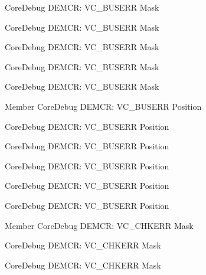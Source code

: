 \begin{DoxyRefList}
\label{deprecated__deprecated000060}%
%
Core\+Debug DEMCR\+: VC\+\_\+\+BUSERR Mask 

\label{deprecated__deprecated000613}%
%
Core\+Debug DEMCR\+: VC\+\_\+\+BUSERR Mask 

\label{deprecated__deprecated000346}%
%
Core\+Debug DEMCR\+: VC\+\_\+\+BUSERR Mask 

\label{deprecated__deprecated000422}%
%
Core\+Debug DEMCR\+: VC\+\_\+\+BUSERR Mask 

\label{deprecated__deprecated000204}%
%
Core\+Debug DEMCR\+: VC\+\_\+\+BUSERR Mask  
\item[Member \doxylink{group__CMSIS__CoreDebug_gab8e3d8f0f9590a51bbf10f6da3ad6933}{Core\+Debug\+\_\+\+DEMCR\+\_\+\+VC\+\_\+\+BUSERR\+\_\+\+Pos} ]\label{deprecated__deprecated000510}%
%
Core\+Debug DEMCR\+: VC\+\_\+\+BUSERR Position 

\label{deprecated__deprecated000612}%
%
Core\+Debug DEMCR\+: VC\+\_\+\+BUSERR Position 

\label{deprecated__deprecated000345}%
%
Core\+Debug DEMCR\+: VC\+\_\+\+BUSERR Position 

\label{deprecated__deprecated000421}%
%
Core\+Debug DEMCR\+: VC\+\_\+\+BUSERR Position 

\label{deprecated__deprecated000203}%
%
Core\+Debug DEMCR\+: VC\+\_\+\+BUSERR Position 

\label{deprecated__deprecated000059}%
%
Core\+Debug DEMCR\+: VC\+\_\+\+BUSERR Position  
\item[Member \doxylink{group__CMSIS__CoreDebug_ga2f98b461d19746ab2febfddebb73da6f}{Core\+Debug\+\_\+\+DEMCR\+\_\+\+VC\+\_\+\+CHKERR\+\_\+\+Msk} ]\label{deprecated__deprecated000350}%
%
Core\+Debug DEMCR\+: VC\+\_\+\+CHKERR Mask 

\label{deprecated__deprecated000617}%
%
Core\+Debug DEMCR\+: VC\+\_\+\+CHKERR Mask 

\label{deprecated__deprecated000208}%
%
Core\+Debug DEMCR\+: VC\+\_\+\+CHKERR Mask 


\end{DoxyRefList}
